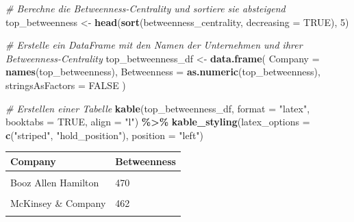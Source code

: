 \documentclass[
]{article}
\newenvironment{Shaded}{\begin{snugshade}}{\end{snugshade}}
\newcommand{\AttributeTok}[1]{\textcolor[rgb]{0.13,0.29,0.53}{#1}}
\newcommand{\CommentTok}[1]{\textcolor[rgb]{0.56,0.35,0.01}{\textit{#1}}}
\newcommand{\ConstantTok}[1]{\textcolor[rgb]{0.56,0.35,0.01}{#1}}
\newcommand{\DecValTok}[1]{\textcolor[rgb]{0.00,0.00,0.81}{#1}}
\newcommand{\FunctionTok}[1]{\textcolor[rgb]{0.13,0.29,0.53}{\textbf{#1}}}
\newcommand{\NormalTok}[1]{#1}
\newcommand{\OtherTok}[1]{\textcolor[rgb]{0.56,0.35,0.01}{#1}}
\newcommand{\SpecialCharTok}[1]{\textcolor[rgb]{0.81,0.36,0.00}{\textbf{#1}}}
\newcommand{\StringTok}[1]{\textcolor[rgb]{0.31,0.60,0.02}{#1}}
\begin{document}
\begin{Shaded}
\begin{Highlighting}[]
\CommentTok{\# Berechne die Betweenness{-}Centrality und sortiere sie absteigend}
\NormalTok{top\_betweenness }\OtherTok{\textless{}{-}} \FunctionTok{head}\NormalTok{(}\FunctionTok{sort}\NormalTok{(betweenness\_centrality, }\AttributeTok{decreasing =} \ConstantTok{TRUE}\NormalTok{), }\DecValTok{5}\NormalTok{)}

\CommentTok{\# Erstelle ein DataFrame mit den Namen der Unternehmen und ihrer Betweenness{-}Centrality}
\NormalTok{top\_betweenness\_df }\OtherTok{\textless{}{-}} \FunctionTok{data.frame}\NormalTok{(}
  \AttributeTok{Company =} \FunctionTok{names}\NormalTok{(top\_betweenness),}
  \AttributeTok{Betweenness =} \FunctionTok{as.numeric}\NormalTok{(top\_betweenness),}
  \AttributeTok{stringsAsFactors =} \ConstantTok{FALSE}
\NormalTok{)}

\CommentTok{\# Erstellen einer Tabelle}
\FunctionTok{kable}\NormalTok{(top\_betweenness\_df, }\AttributeTok{format =} \StringTok{"latex"}\NormalTok{, }\AttributeTok{booktabs =} \ConstantTok{TRUE}\NormalTok{, }\AttributeTok{align =} \StringTok{"l"}\NormalTok{) }\SpecialCharTok{\%\textgreater{}\%}
\FunctionTok{kable\_styling}\NormalTok{(}\AttributeTok{latex\_options =} \FunctionTok{c}\NormalTok{(}\StringTok{"striped"}\NormalTok{, }\StringTok{"hold\_position"}\NormalTok{), }\AttributeTok{position =} \StringTok{"left"}\NormalTok{)}
\end{Highlighting}
\end{Shaded}

\begin{tabular}{ll}
\toprule
Company & Betweenness\\
\midrule
\cellcolor{gray!10}{Gallup} & \cellcolor{gray!10}{479}\\
Booz Allen Hamilton & 470\\
\cellcolor{gray!10}{PA Consulting} & \cellcolor{gray!10}{462}\\
McKinsey \& Company & 462\\
\cellcolor{gray!10}{General Dynamics Information Technology} & \cellcolor{gray!10}{354}\\
\bottomrule
\end{tabular}
\end{document}
